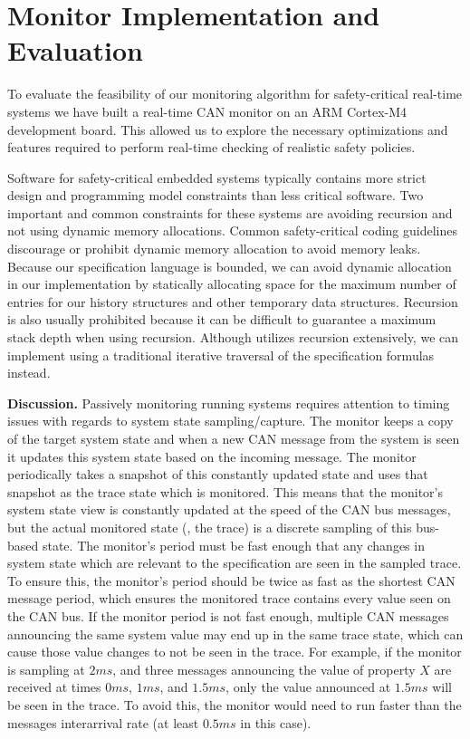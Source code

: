 
\section{Monitor Implementation and Evaluation}
\label{sec:implementation}

To evaluate the feasibility of our monitoring algorithm for safety-critical
real-time systems we have built a real-time CAN monitor on an ARM Cortex-M4
development board. This allowed us to explore the necessary optimizations and
features required to perform real-time checking of realistic safety policies.


Software for safety-critical embedded systems typically contains more strict
design and programming model constraints than less critical software. Two
important and common constraints for these systems are avoiding recursion and
not using dynamic memory allocations.
Common safety-critical coding guidelines discourage or prohibit dynamic memory
allocation to avoid memory leaks.
Because our specification language is bounded, we can avoid dynamic allocation
in our \monitor implementation by statically allocating space for the maximum
number of entries for our history structures and other temporary data structures.
Recursion is also usually prohibited because it can be difficult to guarantee a
maximum stack depth when using recursion. Although \monitor utilizes recursion
extensively, we can implement \monitor using a traditional iterative traversal
of the specification formulas instead.

\noindent\textbf{Discussion. }
Passively monitoring running systems requires attention to timing issues with regards to system state sampling/capture.
%
The monitor keeps a copy of the target system state and when a new CAN message from the system is seen it updates this system state based on the incoming message. The monitor periodically takes a snapshot of this constantly updated state and uses that snapshot as the trace state which is monitored.
%
This means that the monitor's system state view is constantly updated at the speed of the CAN bus messages, but the actual monitored state (\ie, the trace) is a discrete sampling of this bus-based state.
The monitor's period must be fast enough that any changes in system state which are relevant to the specification are seen in the sampled trace.
To ensure this, the monitor's period should be twice as fast as the shortest CAN message period, which ensures the monitored trace contains every value seen on the CAN bus.
If the monitor period is not fast enough, multiple CAN messages announcing the same system value may end up in the same trace state, which can cause those value changes to not be seen in the trace.
For example, if the monitor is sampling at $2ms$, and three messages announcing the value of property $X$ are received at times $0ms$, $1ms$, and $1.5ms$, only the value announced at $1.5ms$ will be seen in the trace. To avoid this, the monitor would need to run faster than the messages interarrival rate (at least $0.5ms$ in this case).

